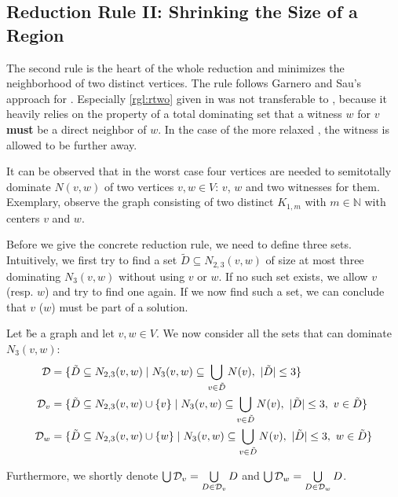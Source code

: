 \subsection{Reduction Rule II: Shrinking the Size of a Region}

The second rule is the heart of the whole reduction and  minimizes the neighborhood of two distinct vertices. The rule follows Garnero and Sau's approach \cite{Garnero2018} for \ptdom. Especially \cref{rgl:rtwo} given in \cite[arXiv v2]{Garnero2018} was not transferable to \psdom, because it heavily relies on the property of a total dominating set that a witness $w$ for $v$ \textbf{must} be a direct neighbor of $w$. In the case of the more relaxed \sdom, the witness is allowed to be further away.


It can be observed that in the worst case four vertices are needed to semitotally dominate $N(v,w)$ of two vertices $v,w \in V$: $v$, $w$ and two witnesses for them. Exemplary, observe the graph consisting of two distinct $K_{1,m}$ with $m \in \mathbb{N}$ with centers $v$ and $w$.

Before we give the concrete reduction rule, we need to define three sets. Intuitively, we first try to find a set $\tilde D \subseteq N_{2,3}(v,w)$ of size at most three dominating $N_3(v,w)$ without using $v$ or $w$. If no such set exists, we allow $v$ (resp. $w$) and try to find one again. If we now find such a set, we can conclude that $v$ ($w$) must be part of a solution.

\begin{definition}\label{def:dvv}
Let \G be a graph and let $v,w \in V$. We now consider all the sets that can dominate $N_3(v,w)$:
\begin{align}
    \mathcal{D} & = \{ \tilde D \subseteq N_{2,3}(v,w)            \mid N_3(v,w) \subseteq \bigcup_{v \in \tilde D} N(v),\ |\tilde D| \leq 3                  \} \\
    \mathcal{D}_{v}  & = \{ \tilde D \subseteq N_{2,3}(v,w) \cup \{v\} \mid N_3(v,w) \subseteq \bigcup_{v \in \tilde D} N(v),\ |\tilde D| \leq 3,\ v \in \tilde D \} \\
    \mathcal{D}_{w}  & = \{ \tilde D \subseteq N_{2,3}(v,w) \cup \{w\} \mid N_3(v,w) \subseteq \bigcup_{v \in \tilde D} N(v),\ |\tilde D| \leq 3,\ w \in \tilde D \}
\end{align}

Furthermore, we shortly denote $\bigcup \mathcal{D}_{v} = \bigcup\limits_{D \in \mathcal{D}_{v}}D $ and $\bigcup \mathcal{D}_{w} = \bigcup\limits_{D \in \mathcal{D}_{w}}D$.
\end{definition}

